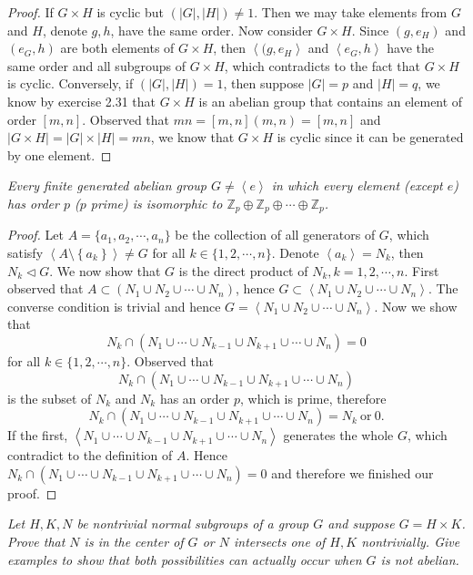 \begin{proof}
If $G\times H$ is cyclic but $(|G|,|H|)\ne 1$. Then we may take elements from $G$ and $H$, denote $g,h$, have the same order. Now consider $G\times H$. Since $(g,e_H)$ and $(e_G,h)$ are both elements of $G\times H$, then $\left<(g,e_H\right>$ and $\left<e_G,h\right>$ have the same order and all subgroups of $G\times H$, which contradicts to the fact that $G\times H$ is cyclic. Conversely, if $(|G|,|H|)=1$, then suppose $|G|=p$ and $|H|=q$, we know by exercise 2.31 that $G\times H$ is an abelian group that contains an element of order $[m,n]$. Observed that $mn=[m,n](m,n)=[m,n]$ and $|G\times H|=|G|\times|H|=mn$, we know that $G\times H$ is cyclic since it can be generated by one element.
\end{proof}
\begin{problem}\em
Every finite generated abelian group $G\ne\left<e\right>$ in which every element (except $e$) has order $p$ ($p$ prime) is isomorphic to $\mathbb{Z}_p\oplus\mathbb{Z}_p\oplus\cdots\oplus\mathbb{Z}_p$.
\end{problem}
\begin{proof}
Let $A=\{a_1,a_2,\cdots,a_n\}$ be the collection of all generators of $G$, which satisfy $\left< A\setminus \left\{ a_k \right\} \right> \ne G$ for all $k\in\{1,2,\cdots,n\}$. Denote $\left<a_k\right>=N_k$, then $N_k\lhd G$. We now show that $G$ is the direct product of $N_k,k=1,2,\cdots,n$. First observed that 
$A\subset (N_1\cup N_2\cup \cdots \cup N_n)$, hence $G\subset \left< N_1\cup N_2\cup \cdots \cup N_n \right> $. The converse condition is trivial and hence $G=\left< N_1\cup N_2\cup \cdots \cup N_n \right> $. Now we show that 
$$N_k\cap \left( N_1\cup \cdots \cup N_{k-1}\cup N_{k+1}\cup \cdots \cup N_n \right) =0$$ 
for all $k\in\{1,2,\cdots,n\}$. Observed that 
$$N_k\cap \left( N_1\cup \cdots \cup N_{k-1}\cup N_{k+1}\cup \cdots \cup N_n \right) $$
is the subset of $N_k$ and $N_k$ has an order $p$, which is prime, therefore 
$$N_k\cap \left( N_1\cup \cdots \cup N_{k-1}\cup N_{k+1}\cup \cdots \cup N_n \right) =N_k\ \text{or}\ 0.$$
If the first, $\left< N_1\cup \cdots \cup N_{k-1}\cup N_{k+1}\cup \cdots \cup N_n \right> $ generates the whole $G$, which contradict to the definition of $A$. Hence $N_k\cap \left( N_1\cup \cdots \cup N_{k-1}\cup N_{k+1}\cup \cdots \cup N_n \right) =0 $ and therefore we finished our proof.
\end{proof}
\begin{problem}\em
Let $H,K,N$ be nontrivial normal subgroups of a group $G$ and suppose $G=H\times K$. Prove that $N$ is in the center of $G$ or $N$ intersects one of $H,K$ nontrivially. Give examples to show that both possibilities can actually occur when $G$ is not abelian.
\end{problem}

